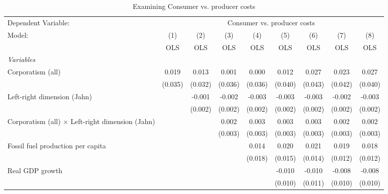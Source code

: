 
\begin{table}[htbp]
   \caption{Examining Consumer vs. producer costs}
   \centering
   \begin{tabular}{lcccccccc}
      \toprule
      Dependent Variable: & \multicolumn{8}{c}{Consumer vs. producer costs}\\
      Model:                                                  & (1)     & (2)     & (3)     & (4)     & (5)     & (6)     & (7)     & (8)\\  
                                                              &  OLS    & OLS     & OLS     & OLS     & OLS     & OLS     & OLS     & OLS\\  
      \midrule
      \emph{Variables}\\
      Corporatism (all)                                       & 0.019   & 0.013   & 0.001   & 0.000   & 0.012   & 0.027   & 0.023   & 0.027\\   
                                                              & (0.035) & (0.032) & (0.036) & (0.036) & (0.040) & (0.043) & (0.042) & (0.040)\\   
      Left-right dimension (Jahn)                             &         & -0.001  & -0.002  & -0.003  & -0.003  & -0.003  & -0.002  & -0.003\\   
                                                              &         & (0.002) & (0.002) & (0.002) & (0.002) & (0.002) & (0.002) & (0.002)\\   
      Corporatism (all) $\times$ Left-right dimension (Jahn)  &         &         & 0.002   & 0.003   & 0.003   & 0.003   & 0.002   & 0.002\\   
                                                              &         &         & (0.003) & (0.003) & (0.003) & (0.003) & (0.003) & (0.003)\\   
      Fossil fuel production per capita                       &         &         &         & 0.014   & 0.020   & 0.021   & 0.019   & 0.018\\   
                                                              &         &         &         & (0.018) & (0.015) & (0.014) & (0.012) & (0.012)\\   
      Real GDP growth                                         &         &         &         &         & -0.010  & -0.010  & -0.008  & -0.008\\   
                                                              &         &         &         &         & (0.010) & (0.011) & (0.010) & (0.010)\\   

\end{tabular}
\end{table}

